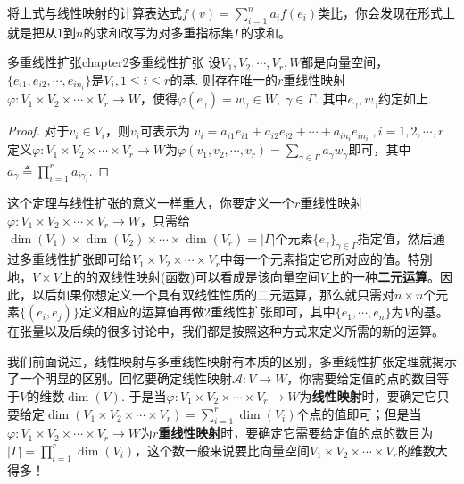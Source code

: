 将上式与线性映射的计算表达式$f(v)=\sum_{i=1}^{n}a_{i}f(e_{i})$类比，你会发现在形式上就是把从$1$到$n$的求和改写为对多重指标集$\Gamma$的求和。
\begin{mythm}{多重线性扩张}{chapter2多重线性扩张}
	设$V_{1},V_{2},\cdots,V_{r},W$都是向量空间，$\{e_{i1},e_{i2},\cdots,e_{in_{i}} \}$是$V_{i},1\leqslant i\leqslant r$的基. 则存在唯一的$r$重线性映射$\varphi:V_{1}\times V_{2}\times\cdots\times V_{r}\longrightarrow W$，使得$\varphi(e_{\gamma})=w_{ \gamma}\in W,\;\gamma\in \Gamma$. 其中$e_{\gamma},w_{\gamma}$约定如上.
\end{mythm}
\begin{proof}
	对于$v_{i}\in V_{i}$，则$v_{i}$可表示为
	$
	v_{i}=a_{i1}e_{i1}+a_{i2}e_{i2}+\cdots+a_{in_{i}}e_{in_{i}}\;,i=1,2,\cdots,r
	$
	定义$\varphi:V_{1}\times V_{2}\times\cdots\times V_{r}\longrightarrow W$为$\varphi(v_{1},v_{2},\cdots,v_{r})=\sum_{ \gamma\in \Gamma }a_{\gamma}w_{\gamma}$即可，其中$a_{\gamma}\triangleq \prod_{i=1}^{r}a_{i\gamma_{i}}$.
\end{proof}

这个定理与线性扩张的意义一样重大，你要定义一个$r$重线性映射$\varphi:V_{1}\times V_{2}\times\cdots\times V_{r}\longrightarrow W$，只需给$\operatorname{dim}(V_{1})\times\operatorname{dim}(V_{2})\times\cdots\times\operatorname{dim}(V_{r})=|\Gamma|$个元素$\{e_{\gamma} \}_{\gamma\in \Gamma}$指定值，然后通过多重线性扩张即可给$V_{1}\times V_{2}\times\cdots\times V_{r}$中每一个元素指定它所对应的值。特别地，$V\times V$上的的双线性映射(函数)可以看成是该向量空间$V$上的一种\textbf{二元运算}。因此，以后如果你想定义一个具有双线性性质的二元运算，那么就只需对$n\times n$个元素$\{(e_{i},e_{j}) \}$定义相应的运算值再做2重线性扩张即可，其中$\{e_{1},\cdots,e_{n} \}$为$V$的基。在张量以及后续的很多讨论中，我们都是按照这种方式来定义所需的新的运算。

我们前面说过，线性映射与多重线性映射有本质的区别，多重线性扩张定理就揭示了一个明显的区别。回忆要确定线性映射$\mathscr{A}:V\longrightarrow W$，你需要给定值的点的数目等于$V$的维数$\operatorname{dim}(V)$. 于是当$\varphi:V_{1}\times V_{2}\times\cdots\times V_{r}\longrightarrow W$为\textbf{线性映射}时，要确定它只要给定$\operatorname{dim}(V_{1}\times V_{2}\times\cdots\times V_{r})=\sum_{i=1}^{r}\operatorname{dim}(V_{i})$个点的值即可；但是当$\varphi:V_{1}\times V_{2}\times\cdots\times V_{r}\longrightarrow W$为\textbf{$r$重线性映射}时，要确定它需要给定值的点的数目为$|\Gamma|=\prod_{i=1}^{r}\operatorname{dim}(V_{i})$，这个数一般来说要比向量空间$V_{1}\times V_{2}\times\cdots\times V_{r}$的维数大得多！

